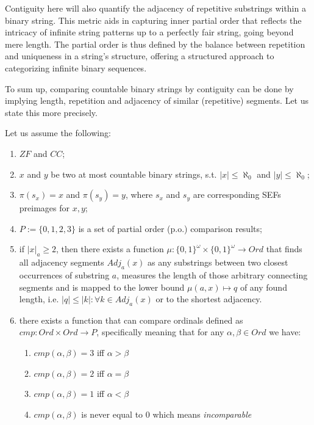 Contiguity here will also quantify the adjacency of repetitive substrings within a binary string. This metric aids in capturing inner partial order that reflects the intricacy of infinite string patterns up to a perfectly fair string, going beyond mere length. The partial order is thus defined by the balance between repetition and uniqueness in a string's structure, offering a structured approach to categorizing infinite binary sequences. 

To sum up, comparing countable binary strings by contiguity can be done by implying length, repetition and adjacency of similar (repetitive) segments. Let us state this more precisely.

\begin{definition}\label{def_cmp_contiguity_bin_str}
  Let us assume the following:
  \begin{enumerate}[label=(\roman*)]
    \item $ZF$ and $CC$;
    \item $x$ and $y$ be two at most countable binary strings, s.t. $|x| \leq \aleph_0$ and $|y| \leq \aleph_0$;
    \item $\pi(s_x) = x$ and $\pi(s_y) = y$, where $s_x$ and $s_y$ are corresponding SEFs preimages for $x, y$;
    \item $P := \{0, 1, 2, 3\}$ is a set of partial order (p.o.) comparison results;
    \item if $|x|_a \geq 2$, then there exists a function $\mu: \{0,1\}^\omega \times \{0,1\}^\omega \to Ord$ that finds all adjacency segments $Adj_{a}(x)$ as any substrings between two closest occurrences of substring $a$, measures the length of those arbitrary connecting segments and is mapped to the lower bound $\mu(a, x) \mapsto q$ of any found length, i.e. $|q| \leq |k|: \forall k \in Adj_{a}(x)$ or to the shortest adjacency.
    \item there exists a function that can compare ordinals defined as $cmp: Ord \times Ord \to P$, specifically meaning that for any $\alpha, \beta \in Ord$ we have:
    \begin{enumerate}
      \item $cmp(\alpha, \beta) = 3$ iff $\alpha > \beta$
      \item $cmp(\alpha, \beta) = 2$ iff $\alpha = \beta$
      \item $cmp(\alpha, \beta) = 1$ iff $\alpha < \beta$
      \item $cmp(\alpha, \beta)$ is never equal to $0$ which means \textit{incomparable}

\end{enumerate}
\end{enumerate}
\end{definition}
